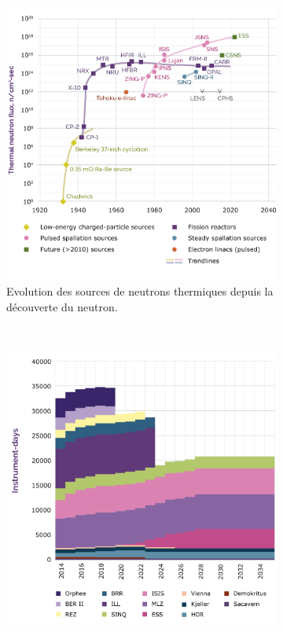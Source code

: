 \begin{figure}[!ht]
	\begin{subfigure}[t]{0.5\textwidth}
		\includegraphics[width=\textwidth]{00_French/figures/fig000_NeutronSources_a}
		\caption[]{Evolution des sources de neutrons thermiques depuis la découverte du neutron.}
		\label{sumfr:fig:NeutronSources_a}
	\end{subfigure}
	~
	\begin{subfigure}[t]{0.5\textwidth}
		\includegraphics[width=\textwidth]{00_French/figures/fig000_NeutronSources_b}

\end{subfigure}
\end{figure}
